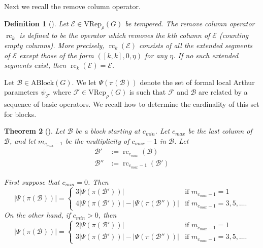 \documentclass[11pt,letterpaper]{amsart}
\newcommand{\VRep}{{\mathrm{VRep}}}
\newcommand{\BB}{\mathcal{B}}
\newcommand{\EE}{\mathcal{E}}
\newcommand{\ABlock}{\mathrm{ABlock}}
\newcommand{\rc}{\operatorname{rc}}
\newtheorem{thm}{Theorem}[section]
\newtheorem{defn}[thm]{Definition}
\numberwithin{equation}{section}
\begin{document}
Next we recall the remove column operator.

\begin{defn}[{\cite[Definition 3.5]{HKT26}}]
    Let $\EE\in  \VRep_\rho(G)$ be tempered. The \emph{remove column} operator $\rc_k$ is defined to be the operator which removes the $k$th column of $\EE$ (counting empty columns). More precisely, $\rc_k(\EE)$ consists of all the extended segments of $\EE$ except those of the form $([k, k], 0, \eta)$ for any $\eta$. If no such extended segments exist, then $\rc_k(\EE) = \EE$.
\end{defn}

Let $\mathcal{B}\in\ABlock(G)$. We let $\Psi(\pi(\mathcal{B}))$ denote the set of formal local Arthur parameters $\psi_{\mathcal{F}}$ where $\mathcal{F}\in\VRep_\rho(G)$ is such that $\mathcal{F}$ and $\mathcal{B}$ are related by a sequence of basic operators. We recall how to determine the cardinality of this set for blocks.

\begin{thm}[{\cite[Theorem 3.6]{HKT26}}]
\label{thm-count-block-temp}
    Let $\mathcal{B}$ be a block starting at $c_{min}$. Let $c_{max}$ be the last column of $\BB$, and let $m_{c_{max}-1}$ be the multiplicity of $c_{max}-1$ in $\mathcal{B}$. Let
    \begin{align*}
        \BB' &:= \rc_{c_{max}}(\BB) \\
        \BB'' &:= \rc_{c_{max}-1}(\BB')
    \end{align*}
    
    First suppose that $c_{min} = 0$. Then 
    \begin{equation} 
    \label{eq first recursion}
    |\Psi(\pi(\mathcal{B}))| = \begin{cases} 3 |\Psi(\pi(\mathcal{B}'))| & \text{if } m_{c_{max}-1} = 1 \\  4 |\Psi(\pi(\mathcal{B}'))| - |\Psi(\pi(\mathcal{B}''))| & \text{if } m_{c_{max}-1} = 3, 5, \dots. \end{cases}
    \end{equation}
    On the other hand, if $c_{min} > 0$, then 
    \begin{equation}
    \label{eq second recursion}
    |\Psi(\pi(\mathcal{B}))| = \begin{cases} 2 |\Psi(\pi(\mathcal{B}'))| & \text{if } m_{c_{max}-1} = 1 \\ 3 |\Psi(\pi(\mathcal{B}'))| - |\Psi(\pi(\mathcal{B}''))| & \text{if } m_{c_{max}-1} = 3, 5, \dots. \end{cases}
    \end{equation}
\end{thm}
\end{document}
